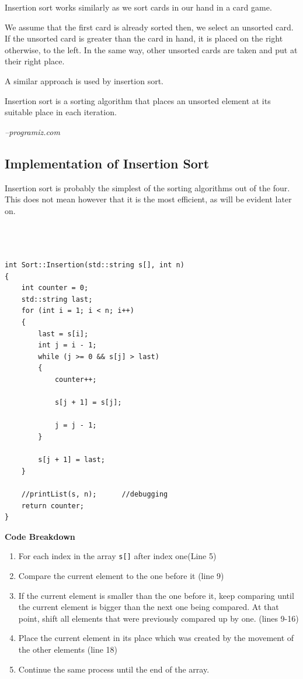 \documentclass[letterpaper, 10pt]{article}
\begin{document}
\begin{displayquote}
Insertion sort works similarly as we sort cards in our hand in a card game.

We assume that the first card is already sorted then, we select an unsorted card. If the unsorted card is greater than the card in hand, it is placed on the right otherwise, to the left. In the same way, other unsorted cards are taken and put at their right place.

A similar approach is used by insertion sort.

Insertion sort is a sorting algorithm that places an unsorted element at its suitable place in each iteration.
\end{displayquote}
{\textit{--programiz.com}}
\subsection{Implementation of Insertion Sort}

Insertion sort is probably the simplest of the sorting algorithms out of the four. This does not mean however that it is the most efficient, as will be evident later on. 







\begin{addmargin}[-5em]{1em}
\begin{small}
\begin{verbatim}



int Sort::Insertion(std::string s[], int n)
{
	int counter = 0;
	std::string last;
	for (int i = 1; i < n; i++)
	{
		last = s[i];
		int j = i - 1;
		while (j >= 0 && s[j] > last)
		{
			counter++;
			
			s[j + 1] = s[j];

			j = j - 1;
		}
	
		s[j + 1] = last;
	}

	//printList(s, n);		//debugging
	return counter;
}
\end{verbatim}
\end{small}
\end{addmargin}


\begin{center}
    \textbf{Code Breakdown}
\end{center}
\begin{enumerate}
    \item For each index in the array \texttt{s[]} after index one(Line 5)
    \item Compare the current element to the one before it (line 9)
    \item If the current element is smaller than the one before it, keep comparing until the current element is bigger than the next one being compared. At that point, shift all elements that were previously compared up by one. (lines 9-16)
    \item Place the current element in its place which was created by the movement of the other elements (line 18)
    \item Continue the same process until the end of the array.
\end{enumerate}
\end{document}
